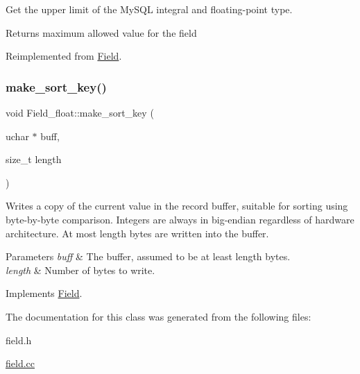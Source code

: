 Get the upper limit of the My\+S\+QL integral and floating-\/point type.

\begin{DoxyReturn}{Returns}
maximum allowed value for the field 
\end{DoxyReturn}


Reimplemented from \mbox{\hyperlink{classField_a22f18fbe3224a5ac4f23a90523b09087}{Field}}.

\mbox{\label{classField__float_ad1d059c7898486036b042db473b0bdb4}} 
\subsubsection{\texorpdfstring{make\+\_\+sort\+\_\+key()}{make\_sort\_key()}}
{\footnotesize\ttfamily void Field\+\_\+float\+::make\+\_\+sort\+\_\+key (\begin{DoxyParamCaption}\item[{uchar $\ast$}]{buff,  }\item[{size\+\_\+t}]{length }\end{DoxyParamCaption})\hspace{0.3cm}{\ttfamily [virtual]}}

Writes a copy of the current value in the record buffer, suitable for sorting using byte-\/by-\/byte comparison. Integers are always in big-\/endian regardless of hardware architecture. At most length bytes are written into the buffer.


\begin{DoxyParams}{Parameters}
{\em buff} & The buffer, assumed to be at least length bytes.\\
\hline
{\em length} & Number of bytes to write. \\
\hline
\end{DoxyParams}


Implements \mbox{\hyperlink{classField_af3bc27d237b6ae6ef3dc7a2aec3d79ac}{Field}}.



The documentation for this class was generated from the following files\+:\begin{DoxyCompactItemize}
\item 
field.\+h\item 
\mbox{\hyperlink{field_8cc}{field.\+cc}}\end{DoxyCompactItemize}
